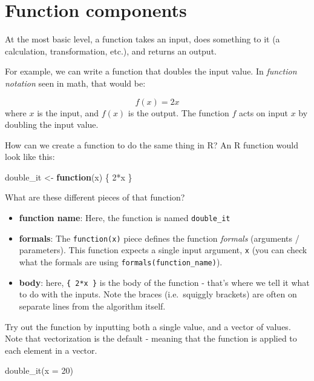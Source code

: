 \documentclass[
]{book}
\newenvironment{Shaded}{\begin{snugshade}}{\end{snugshade}}
\newcommand{\AttributeTok}[1]{\textcolor[rgb]{0.77,0.63,0.00}{#1}}
\newcommand{\ControlFlowTok}[1]{\textcolor[rgb]{0.13,0.29,0.53}{\textbf{#1}}}
\newcommand{\DecValTok}[1]{\textcolor[rgb]{0.00,0.00,0.81}{#1}}
\newcommand{\FunctionTok}[1]{\textcolor[rgb]{0.00,0.00,0.00}{#1}}
\newcommand{\NormalTok}[1]{#1}
\newcommand{\OtherTok}[1]{\textcolor[rgb]{0.56,0.35,0.01}{#1}}
\newcommand{\SpecialCharTok}[1]{\textcolor[rgb]{0.00,0.00,0.00}{#1}}
\providecommand{\tightlist}{%
  \setlength{\itemsep}{0pt}\setlength{\parskip}{0pt}}
\begin{document}
\hypertarget{function-components}{%
\section{Function components}\label{function-components}}

At the most basic level, a function takes an input, does something to it (a calculation, transformation, etc.), and returns an output.

For example, we can write a function that doubles the input value. In \emph{function notation} seen in math, that would be:

\[f(x) = 2x\]
where \(x\) is the input, and \(f(x)\) is the output. The function \(f\) acts on input \(x\) by doubling the input value.

How can we create a function to do the same thing in R? An R function would look like this:

\begin{Shaded}
\begin{Highlighting}[]
\NormalTok{double\_it }\OtherTok{\textless{}{-}} \ControlFlowTok{function}\NormalTok{(x) \{}
  \DecValTok{2}\SpecialCharTok{*}\NormalTok{x}
\NormalTok{\}}
\end{Highlighting}
\end{Shaded}

What are these different pieces of that function?

\begin{itemize}
\tightlist
\item
  \textbf{function name}: Here, the function is named \texttt{double\_it}
\item
  \textbf{formals}: The \texttt{function(x)} piece defines the function \emph{formals} (arguments / parameters). This function expects a single input argument, \texttt{x} (you can check what the formals are using \texttt{formals(function\_name)}).
\item
  \textbf{body}: here, \texttt{\{\ 2*x\ \}} is the body of the function - that's where we tell it what to do with the inputs. Note the braces (i.e.~squiggly brackets) are often on separate lines from the algorithm itself.
\end{itemize}

Try out the function by inputting both a single value, and a vector of values. Note that vectorization is the default - meaning that the function is applied to each element in a vector.

\begin{Shaded}
\begin{Highlighting}[]
\FunctionTok{double\_it}\NormalTok{(}\AttributeTok{x =} \DecValTok{20}\NormalTok{)}
\end{Highlighting}
\end{Shaded}
\end{document}
